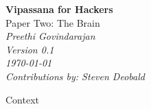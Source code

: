 \documentclass{article}
\begin{document}
\begin{titlepage}
   \begin{center}
     \Huge\textbf{Vipassana for Hackers}\\
     \Huge{Paper Two: The Brain}\\
     \vspace{5cm}
     \large\textit{Preethi Govindarajan}\\
     \large\textit{Version 0.1}\\
     \large\textit\today\\
     \vspace{5cm}
     \large\textit{Contributions by: Steven Deobald}\\
   \end{center}
\end{titlepage}

\begin{center}
  \Huge{Context}
\end{center}
\end{document}
